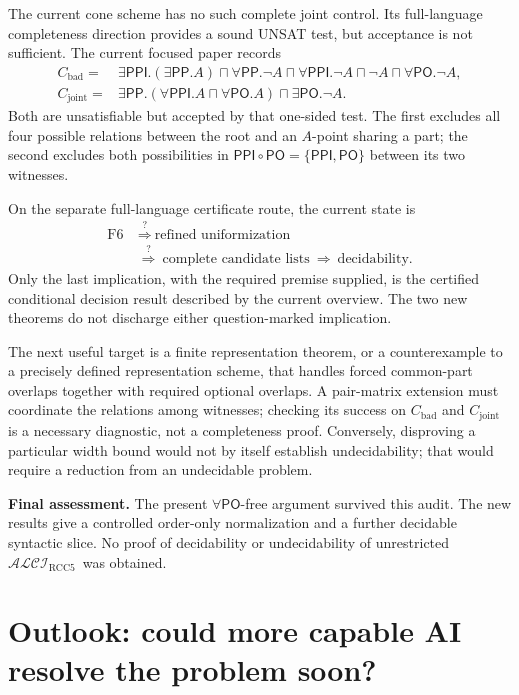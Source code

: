 \documentclass[11pt,letterpaper]{article}
\newcommand{\logic}{\ensuremath{\mathcal{ALCI}_{\mathrm{RCC5}}}}
\newcommand{\PP}{\mathsf{PP}}
\newcommand{\PPI}{\mathsf{PPI}}
\newcommand{\PO}{\mathsf{PO}}
\theoremstyle{definition}
\theoremstyle{remark}
\begin{document}
The current cone scheme has no such complete joint control. Its
full-language completeness direction provides a sound UNSAT test, but
acceptance is not sufficient. The current focused paper records
\begin{align*}
C_{\mathrm{bad}}={}&\exists\PPI.(\exists\PP.A)
  \sqcap\forall\PP.\neg A\sqcap\forall\PPI.\neg A
  \sqcap\neg A\sqcap\forall\PO.\neg A,\\
C_{\mathrm{joint}}={}&
\exists\PP.(\forall\PPI.A\sqcap\forall\PO.A)
  \sqcap\exists\PO.\neg A.
\end{align*}
Both are unsatisfiable but accepted by that one-sided test. The first
excludes all four possible relations between the root and an $A$-point
sharing a part; the second excludes both possibilities in
$\PPI\circ\PO=\{\PPI,\PO\}$ between its two witnesses.

On the separate full-language certificate route, the current state is
\[
\begin{aligned}
\text{F6}
&\ \overset{?}{\Longrightarrow}\ \text{refined uniformization}\\
&\ \overset{?}{\Longrightarrow}\ \text{complete candidate lists}
\ \Longrightarrow\ \text{decidability}.
\end{aligned}
\]
Only the last implication, with the required premise supplied, is the
certified conditional decision result described by the current overview.
The two new theorems do not discharge either question-marked implication.

The next useful target is a finite representation theorem, or a
counterexample to a precisely defined representation scheme, that handles
forced common-part overlaps together with required optional overlaps.
A pair-matrix extension must coordinate the relations among witnesses;
checking its success on $C_{\mathrm{bad}}$ and $C_{\mathrm{joint}}$ is a
necessary diagnostic, not a completeness proof. Conversely, disproving
a particular width bound would not by itself establish undecidability;
that would require a reduction from an undecidable problem.

\textbf{Final assessment.} The present $\forall\PO$-free argument
survived this audit. The new results give a controlled order-only
normalization and a further decidable syntactic slice. No proof of
decidability or undecidability of unrestricted \logic\ was obtained.

\section{Outlook: could more capable AI resolve the problem soon?}
\label{sec:outlook}
\end{document}
